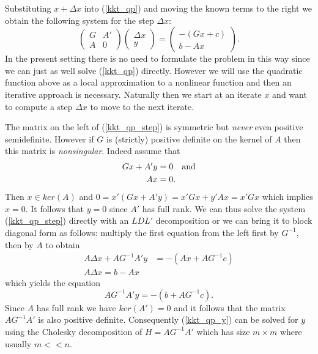 Substituting $x+\Delta x$ into (\ref{kkt_qp}) and moving the  
known terms to the right we obtain the following system for the step $\Delta x$:
%
\begin{equation}
\label{kkt_qp_step}
\begin{pmatrix}
G & A'\\
A & 0
\end{pmatrix}
\begin{pmatrix}
\Delta x\\
y
\end{pmatrix}
=
\begin{pmatrix}
-(Gx+c)\\
b-Ax
\end{pmatrix}.
\end{equation}  
%
In the present setting there is no need to formulate the problem in this way
since we can just as well solve (\ref{kkt_qp}) directly. However we will use the
quadratic function above as a local approximation to a nonlinear function and 
then an iterative approach is necessary. Naturally then we start at an iterate
$x$ and want to compute a step $\Delta x$ to move to the next iterate.

The matrix on the left of (\ref{kkt_qp_step}) is symmetric but \textit{never}
even positive semidefinite.
However if $G$ is (strictly) positive definite on the kernel of $A$ then this 
matrix is \textit{nonsingular}. Indeed assume that
%
\begin{align*}
Gx+A'y&=0\quad\text{and}\\
Ax&=0.
\end{align*}
% 
Then $x\in ker(A)$ and $0=x'(Gx+A'y)=x'Gx+y'Ax=x'Gx$ which implies $x=0$. It 
follows that $y=0$ since $A'$ has full rank. We can thus solve the system
(\ref{kkt_qp_step}) directly with an $LDL'$ decomposition or we can bring it
to block diagonal form as follows: multiply the first equation from the left 
first by $G^{-1}$, then by $A$ to obtain
%
\begin{align*}
A\Delta x+AG^{-1}A'y &= -(Ax+AG^{-1}c)\\
A\Delta x = b-Ax 
\end{align*}  
%
which yields the equation
%
\begin{equation}
\label{kkt_qp_y}
AG^{-1}A'y = -(b+AG^{-1}c).
\end{equation}  
%
Since $A$ has full rank we have $ker(A')=0$ and it follows that the matrix
$AG^{-1}A'$ is also positive definite. Consequently (\ref{kkt_qp_y}) can be   
solved for $y$ using the Cholesky decomposition of $H=AG^{-1}A'$ which has
size $m\times m$ where usually $m<<n$. 

